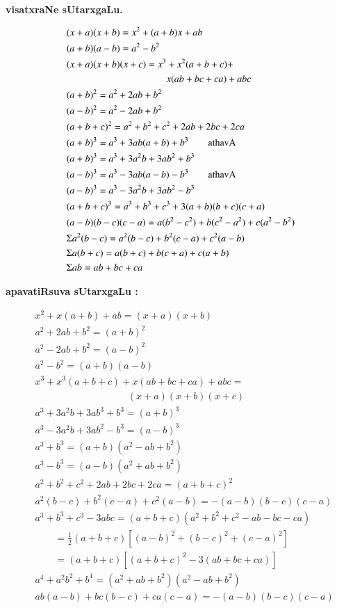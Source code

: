 \newpage

\centerline{\large\bf visatxraNe sUtarxgaLu. }
\begin{align*}
& (x+a)(x+b)=x^{2}+(a+b)x+ab\\
& (a+b)(a-b)=a^{2}-b^{2}\\
& (x+a)(x+b)(x+c)=x^{3}+x^{2}(a+b+c)+\\
&\hspace{3.6cm} x(ab+bc+ca)+abc\\
& (a+b)^{2}=a^{2}+2ab+b^{2}\\
& (a-b)^{2}=a^{2}-2ab+b^{2}\\
& (a+b+c)^{2}=a^{2}+b^{2}+c^{2}+2ab+2bc+2ca\\
& (a+b)^{3}=a^{3}+3ab(a+b)+b^{3}\qquad\text{athavA}\\
& (a+b)^{3}=a^{3}+3a^{2}b+3ab^{2}+b^{3}\\
& (a-b)^{3}=a^{3}-3ab(a-b)-b^{3}\qquad\text{athavA}\\
& (a-b)^{3}=a^{3}-3a^{2}b+3ab^{2}-b^{3}\\
& (a+b+c)^{3}=a^{3}+b^{3}+c^{3}+3(a+b)(b+c)(c+a)\\
& (a-b)(b-c)(c-a)=a(b^{2}-c^{2})+b(c^{2}-a^{2})+c(a^{2}-b^{2})\\
& \Sigma a^{2}(b-c)=a^{2}(b-c)+b^{2}(c-a)+c^{2}(a-b)\\
& \Sigma a(b+c)=a(b+c)+b(c+a)+c(a+b)\\
& \Sigma ab=ab+bc+ca
\end{align*}
\centerline{\large\bf apavatiRsuva sUtarxgaLu : }
\begin{align*}
& x^{2}+x(a+b)+ab=(x+a)(x+b)\\
& a^{2}+2ab+b^{2}=(a+b)^{2}\\
& a^{2}-2ab+b^{2}=(a-b)^{2}\\
& a^{2}-b^{2}=(a+b)(a-b)\\
& x^{3}+x^{3}(a+b+c)+x(ab+bc+ca)+abc=\\
& \hspace{4cm} (x+a)(x+b)(x+c)\\
& a^{3}+3a^{2}b+3ab^{3}+b^{3}=(a+b)^{3}\\
& a^{3}-3a^{2}b+3ab^{2}-b^{3}=(a-b)^{3}\\
& a^{3}+b^{3}=(a+b)(a^{2}-ab+b^{2})\\
& a^{3}-b^{3}=(a-b)(a^{2}+ab+b^{2})\\
& a^{2}+b^{2}+c^{2}+2ab+2bc+2ca=(a+b+c)^{2}\\
& a^{2}(b-c)+b^{2}(c-a)+c^{2}(a-b)=-(a-b)(b-c)(c-a)\\
& a^{3}+b^{3}+c^{3}-3abc=(a+b+c)(a^{2}+b^{2}+c^{2}-ab-bc-ca)\\
&\qquad = \frac{1}{2}(a+b+c)[(a-b)^{2}+(b-c)^{2}+(c-a)^{2}]\\
&\qquad = (a+b+c)[(a+b+c)^{2}-3(ab+bc+ca)]\\
& a^{4}+a^{2}b^{2}+b^{4}=(a^{2}+ab+b^{2})(a^{2}-ab+b^{2})\\
& ab(a-b)+bc(b-c)+ca(c-a)=-(a-b)(b-c)(c-a)
\end{align*}
